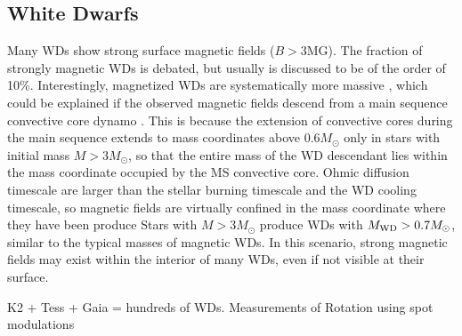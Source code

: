 {\color{red} \subsection{White Dwarfs}}
Many WDs show strong surface magnetic fields ($B>$3MG). The fraction of strongly magnetic WDs is debated, but usually is discussed to be of the order of 10\%. Interestingly, magnetized WDs are systematically more massive \cite{Ferrario_2015}, which could be explained if the observed magnetic fields descend from a main sequence convective core dynamo \cite{Cantiello_2016}. This is because the extension of convective cores during the main sequence extends to mass coordinates above 0.6$M_\odot$ only in stars with initial mass $M>3M_\odot$, so that the entire mass of the WD descendant lies within the mass coordinate occupied by the MS convective core. Ohmic diffusion timescale are larger than the stellar burning timescale and the WD cooling timescale, so magnetic fields are virtually confined in the mass coordinate where they have been produce   Stars with $M>3M_\odot$ produce WDs with $M_{\rm WD}>0.7M_\odot$, similar to the typical masses of magnetic WDs. In this scenario, strong magnetic fields may exist within the interior of many WDs, even if not visible at their surface. 

K2 + Tess + Gaia = hundreds of WDs. Measurements of Rotation using spot modulations